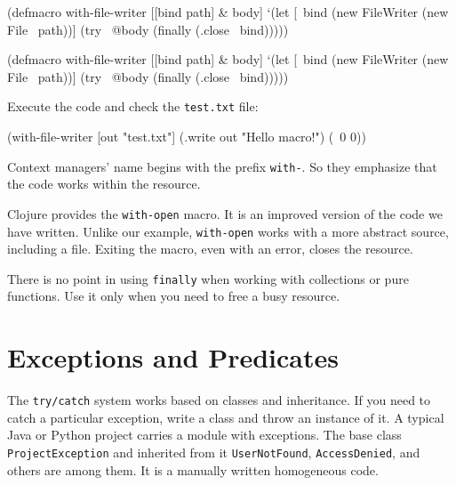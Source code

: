 
\ifx\DEVICETYPE\MOBILE

\begin{clojure}
(defmacro with-file-writer
  [[bind path] & body]
  `(let [~bind (new FileWriter
                 (new File ~path))]
     (try
       ~@body
       (finally
         (.close ~bind)))))
\end{clojure}

\else

\begin{clojure}
(defmacro with-file-writer
  [[bind path] & body]
  `(let [~bind (new FileWriter (new File ~path))]
     (try
       ~@body
       (finally
         (.close ~bind)))))
\end{clojure}

\fi

Execute the code and check the \verb|test.txt| file:

\begin{clojure}
(with-file-writer [out "test.txt"]
  (.write out "Hello macro!")
  (\ 0 0))
\end{clojure}

Context managers' name begins with the prefix \verb|with-|. So they emphasize that the code works within the resource.


Clojure provides the \verb|with-open| macro. It is an improved version of the code we have written. Unlike our example, \verb|with-open| works with a more abstract source, including a file. Exiting the macro, even with an error, closes the resource.

There is no point in using \verb|finally| when working with collections or pure functions. Use it only when you need to free a busy resource.

\section{Exceptions and Predicates}


The \verb|try/catch| system works based on classes and inheritance. If you need to catch a particular exception, write a class and throw an instance of it. A typical Java or Python project carries a module with exceptions.
The base class \verb|ProjectException| and inherited from it \verb|UserNotFound|, \verb|AccessDenied|, and others are among them. It is a manually written homogeneous code.

